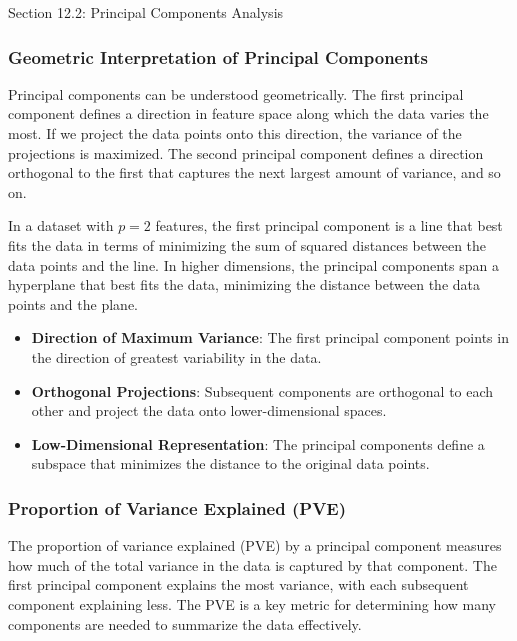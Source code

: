 \begin{notes}{Section 12.2: Principal Components Analysis}
    \subsubsection*{Geometric Interpretation of Principal Components}
    
    Principal components can be understood geometrically. The first principal component defines a direction in feature space along which the data varies the most. If we project the data points onto this direction, 
    the variance of the projections is maximized. The second principal component defines a direction orthogonal to the first that captures the next largest amount of variance, and so on.
    
    In a dataset with $p = 2$ features, the first principal component is a line that best fits the data in terms of minimizing the sum of squared distances between the data points and the line. In higher dimensions, 
    the principal components span a hyperplane that best fits the data, minimizing the distance between the data points and the plane.
    
    \begin{highlight}
        \begin{itemize}
            \item \textbf{Direction of Maximum Variance}: The first principal component points in the direction of greatest variability in the data.
            \item \textbf{Orthogonal Projections}: Subsequent components are orthogonal to each other and project the data onto lower-dimensional spaces.
            \item \textbf{Low-Dimensional Representation}: The principal components define a subspace that minimizes the distance to the original data points.
        \end{itemize}
    \end{highlight}
    
    \subsubsection*{Proportion of Variance Explained (PVE)}
    
    The proportion of variance explained (PVE) by a principal component measures how much of the total variance in the data is captured by that component. The first principal component explains the most variance, 
    with each subsequent component explaining less. The PVE is a key metric for determining how many components are needed to summarize the data effectively.
    

\end{notes}
